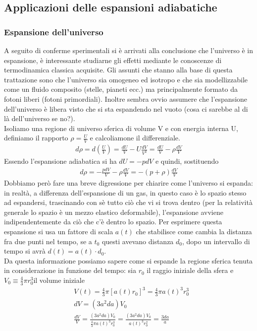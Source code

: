 \documentclass[
10pt, %
a4paper, %
oneside, %
headinclude,footinclude, %
BCOR5mm, %
]{scrartcl}
\begin{document}
\subsection{Applicazioni delle espansioni adiabatiche}
\subsubsection{Espansione dell'universo}
A seguito di conferme sperimentali si è arrivati alla conclusione che l'universo è in espansione, è interessante studiarne gli effetti mediante le conoscenze di termodinamica classica acquisite. Gli assunti che stanno alla base di questa trattazione sono che l'universo sia omogeneo ed isotropo e che sia modellizzabile come un fluido composito (stelle, pianeti ecc.) ma principalmente formato da fotoni liberi (fotoni primordiali). Inoltre sembra ovvio assumere che l'espansione dell'universo è libera visto che si sta espandendo nel vuoto (cosa ci sarebbe al di là dell'universo se no?).\\
Isoliamo una regione di universo sferica di volume V e con energia interna U, definiamo il rapporto \(\rho = \frac{U}{V}\) e calcoliamone il differenziale. 
\begin{align*}
	d\rho = d\left(\frac{U}{V}\right) = \frac{d U}{V}- U \frac{dV}{V^2} = \frac{dU}{V}-\rho\frac{dV}{V}
\end{align*}
Essendo l'espansione adiabatica si ha \(dU = -pdV\) e quindi, sostituendo
\begin{align*}
	d\rho = -\frac{pdV}{V}-\rho\frac{dV}{V} = -(p + \rho)\frac{dV}{V}
\end{align*}
Dobbiamo però fare una breve digressione per chiarire come l'universo si espanda: in realtà, a differenza dell'espansione di un gas, in questo caso è lo spazio stesso ad espandersi, trascinando con sè tutto ciò che vi si trova dentro (per la relatività generale lo spazio è un mezzo elastico deformabile), l'espansione avviene indipendentemente da ciò che c'è dentro lo spazio. Per esprimere questa espansione si usa un fattore di scala $a(t)$ che stabilisce come cambia la distanza fra due punti nel tempo, se a $t_0$ questi avevano distanza $d_0$, dopo un intervallo di tempo si avrà \(d(t) = a(t)\cdot d_0\).\\
Da questa informazione possiamo sapere come si espande la regione sferica tenuta in considerazione in funzione del tempo: sia $r_0$ il raggio iniziale della sfera e $V_0 \equiv \frac{4}{3}\pi r_0^3$il volume iniziale
\begin{align*}
	&V(t) = \frac{4}{3}\pi[a(t) r_0]^3 = \frac{4}{3}\pi a(t)^3 r_0^3\\
	&dV = (3 a^2 da) V_0\\
	&\frac{dV}{V} = \frac{(3 a^2 da) V_0}{\frac{4}{3}\pi a(t)^3 r_0^3} = \frac{(3 a^2 da) V_0}{ a(t)^3 r_0^2} =\frac{3 da}{a}
\end{align*}
\end{document}
